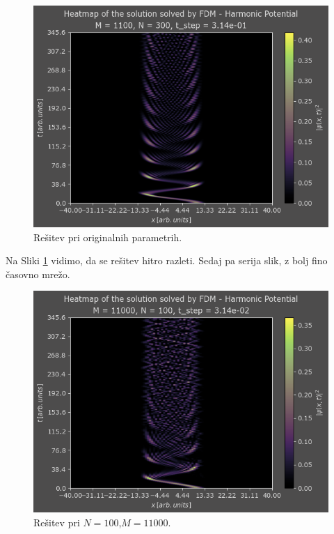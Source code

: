 \documentclass[a4paper]{article}
\begin{document}
\begin{figure}[p]
    \centering
    \includegraphics[width=\textwidth]{./images/case1_org.png}
    \caption{Rešitev pri originalnih parametrih.}
    \label{fig:harmonic_oscillator_org}
\end{figure}

Na Sliki \ref{fig:harmonic_oscillator_org} vidimo, da se rešitev hitro razleti. 
Sedaj pa serija slik, z bolj fino časovno mrežo.

\begin{figure}[p]
    \centering
    \includegraphics[width=\textwidth]{./images/case1_N100.png}
    \caption{Rešitev pri $N=100$,$M=11000$.}
    \label{fig:harmonic_oscillator_N100}
\end{figure}
\end{document}
